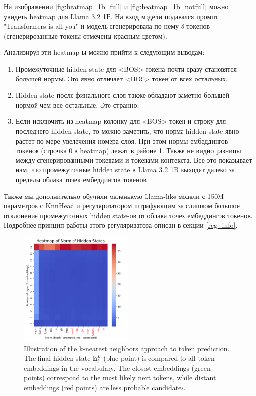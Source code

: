 На изображении \ref{fig:heatmap_1b_full} и \ref{fig:heatmap_1b_notfull} можно увидеть heatmap для Llama 3.2 1B. На вход модели подавался промпт "Transformers is all you" и модель сгенерировала по нему 8 токенов (сгенерированные токены отмечены красным цветом). 

Анализируя эти heatmap-ы можно прийти к следующим выводам:
\begin{enumerate}
    \item Промежуточные hidden state для <BOS> токена почти сразу становятся большой нормы. Это явно отличает <BOS> токен от всех остальных.
    \item Hidden state после финального слоя также обладают заметно большей нормой чем все остальные. Это странно.
    \item Если исключить из heatmap колонку для <BOS> токен и строку для последнего hidden state, то можно заметить, что норма hidden state явно растет по мере увелечения номера слоя. При этом нормы ембеддингов токенов (строчка 0 в heatmap) лежат в районе 1. Также не видно разницы между сгенерированными токенами и токенами контекста. Все это показывает нам, что промежуточные hidden state в Llama 3.2 1B выходят далеко за пределы облака точек ембеддингов токенов.
\end{enumerate}


Также мы дополнительно обучили маленькую Llama-like модели с 150M параметров с KnnHead и регуляризатором штрафующим за слишком большое отклонение промежуточных hidden state-ов от облака точек ембеддингов токенов. Подробнее принцип работы этого регуляризатора описан в секции \ref{reg_info}.


\begin{figure}[h]
    \centering
    \includegraphics[width=0.5\textwidth]{images/heatmap_150m_reg_all.png}
    \caption{Illustration of the k-nearest neighbors approach to token prediction. The final hidden state $\mathbf{h}_i^L$ (blue point) is compared to all token embeddings in the vocabulary. The closest embeddings (green points) correspond to the most likely next tokens, while distant embeddings (red points) are less probable candidates.}
    \label{fig:heatmap_150m_reg_all}
\end{figure}

